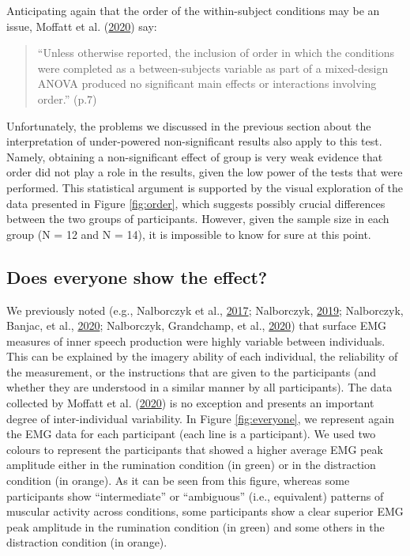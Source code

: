 \documentclass[
  english,
  man, donotrepeattitle,floatsintext]{apa6}
\begin{document}
Anticipating again that the order of the within-subject conditions may be an issue, Moffatt et al. (\protect\hyperlink{ref-moffatt_inner_2020}{2020}) say:

\begin{quote}
``Unless otherwise reported, the inclusion of order in which the conditions were completed as a between-subjects variable as part of a mixed-design ANOVA produced no significant main effects or interactions involving order.'' (p.7)
\end{quote}

Unfortunately, the problems we discussed in the previous section about the interpretation of under-powered non-significant results also apply to this test. Namely, obtaining a non-significant effect of group is very weak evidence that order did not play a role in the results, given the low power of the tests that were performed. This statistical argument is supported by the visual exploration of the data presented in Figure \ref{fig:order}, which suggests possibly crucial differences between the two groups of participants. However, given the sample size in each group (N = 12 and N = 14), it is impossible to know for sure at this point.

\hypertarget{does-everyone-show-the-effect}{%
\subsection{Does everyone show the effect?}\label{does-everyone-show-the-effect}}

We previously noted (e.g., Nalborczyk et al., \protect\hyperlink{ref-nalborczyk_orofacial_2017}{2017}; Nalborczyk, \protect\hyperlink{ref-nalborczyk_understanding_2019}{2019}; Nalborczyk, Banjac, et al., \protect\hyperlink{ref-nalborczyk_dissociating_2020}{2020}; Nalborczyk, Grandchamp, et al., \protect\hyperlink{ref-nalborczyk_can_2020}{2020}) that surface EMG measures of inner speech production were highly variable between individuals. This can be explained by the imagery ability of each individual, the reliability of the measurement, or the instructions that are given to the participants (and whether they are understood in a similar manner by all participants). The data collected by Moffatt et al. (\protect\hyperlink{ref-moffatt_inner_2020}{2020}) is no exception and presents an important degree of inter-individual variability. In Figure \ref{fig:everyone}, we represent again the EMG data for each participant (each line is a participant). We used two colours to represent the participants that showed a higher average EMG peak amplitude either in the rumination condition (in green) or in the distraction condition (in orange). As it can be seen from this figure, whereas some participants show ``intermediate'' or ``ambiguous'' (i.e., equivalent) patterns of muscular activity across conditions, some participants show a clear superior EMG peak amplitude in the rumination condition (in green) and some others in the distraction condition (in orange).
\end{document}
